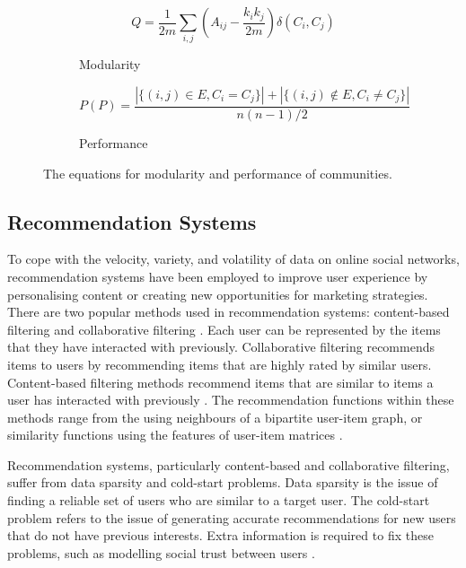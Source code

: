 \vspace{-15pt}
\begin{figure}[h]
  \centering
  \begin{subfigure}{0.3\linewidth}
    \centering
    $$Q = \frac{1}{2m} \sum_{i,j} \left( A_{ij} - \frac{k_i k_j}{2m} \right) \delta(C_i, C_j)$$
    \caption{Modularity}
    \label{fig:figure1}
  \end{subfigure}
  \hspace{0.1\linewidth}
  \begin{subfigure}{0.5\linewidth}
    \centering
    $$P(P) = \frac{| \{(i,j) \in E, C_i=C_j\}| + | \{(i,j) \notin {E}, C_i \neq C_j\}|}{n(n-1)/2}$$
    \caption{Performance}
    \label{fig:figure2}
  \end{subfigure}
  \caption{The equations for modularity and performance of communities.}
  \label{fig:figures}
\end{figure}
\vspace{-20pt}

\subsection{Recommendation Systems}

To cope with the velocity, variety, and volatility of data on online social networks, recommendation systems have been employed to improve user experience by personalising content or creating new opportunities for marketing strategies. There are two popular methods used in recommendation systems: content-based filtering and collaborative filtering \cite{Eirinaki_Gao_Varlamis_Tserpes_2018}. Each user can be represented by the items that they have interacted with previously. Collaborative filtering recommends items to users by recommending items that are highly rated by similar users. Content-based filtering methods recommend items that are similar to items a user has interacted with previously \cite{Kazienko_Musial_Kajdanowicz_2011}. The recommendation functions within these methods range from the using neighbours of a bipartite user-item graph, or similarity functions using the features of user-item matrices \cite{Eirinaki_Gao_Varlamis_Tserpes_2018}. 


Recommendation systems, particularly content-based and collaborative filtering, suffer from data sparsity and cold-start problems. Data sparsity is the issue of finding a reliable set of users who are similar to a target user. The cold-start problem refers to the issue of generating accurate recommendations for new users that do not have previous interests. Extra information is required to fix these problems, such as modelling social trust between users \cite{Guo_Zhang_Thalmann_2014}.


